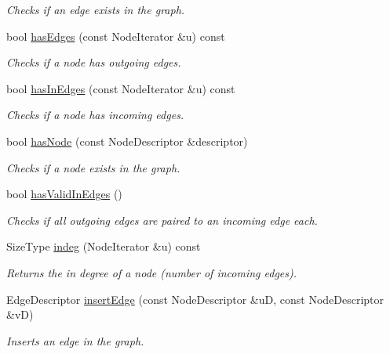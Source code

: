 \begin{DoxyCompactItemize}
\begin{DoxyCompactList}\small\item\em Checks if an edge exists in the graph. \item\end{DoxyCompactList}\item 
bool \hyperlink{class_dynamic_graph_a6adc3ab6d95d3d2e6c8ca8d3b4238a39}{hasEdges} (const NodeIterator \&u) const 
\begin{DoxyCompactList}\small\item\em Checks if a node has outgoing edges. \item\end{DoxyCompactList}\item 
bool \hyperlink{class_dynamic_graph_a4d753757a2a83708ddaabee45318c523}{hasInEdges} (const NodeIterator \&u) const 
\begin{DoxyCompactList}\small\item\em Checks if a node has incoming edges. \item\end{DoxyCompactList}\item 
bool \hyperlink{class_dynamic_graph_ab5c40bda53d5e3cd1e03078a64982384}{hasNode} (const NodeDescriptor \&descriptor)
\begin{DoxyCompactList}\small\item\em Checks if a node exists in the graph. \item\end{DoxyCompactList}\item 
bool \hyperlink{class_dynamic_graph_af9c2a597b80be5d539b085eb926ffec9}{hasValidInEdges} ()
\begin{DoxyCompactList}\small\item\em Checks if all outgoing edges are paired to an incoming edge each. \item\end{DoxyCompactList}\item 
SizeType \hyperlink{class_dynamic_graph_adf611f51b16f0fd3d2569c97ce966ff8}{indeg} (NodeIterator \&u) const 
\begin{DoxyCompactList}\small\item\em Returns the in degree of a node (number of incoming edges). \item\end{DoxyCompactList}\item 
EdgeDescriptor \hyperlink{class_dynamic_graph_ab779220d756b42794b03e3176e95bd58}{insertEdge} (const NodeDescriptor \&uD, const NodeDescriptor \&vD)
\begin{DoxyCompactList}\small\item\em Inserts an edge in the graph. \item\end{DoxyCompactList}\item 

\end{DoxyCompactItemize}

